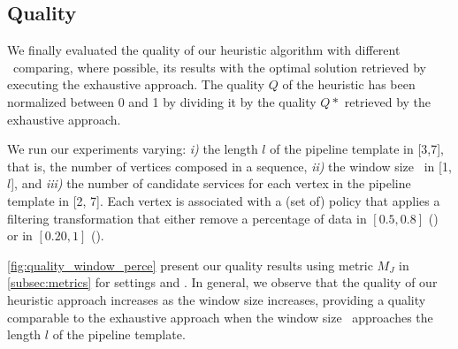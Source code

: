 
  \subsection{Quality}\label{subsec:experiments_quality}
  We finally evaluated the quality of our heuristic algorithm with different \windowsize\ comparing, where possible, its results with the optimal solution retrieved by executing the exhaustive approach. %
  The quality $Q$ of the heuristic has been normalized between 0 and 1 by dividing it by the quality $Q*$ retrieved by the exhaustive approach.


  We run our experiments varying: \emph{i)} the length $l$ of the pipeline template in [3,7], that is, the number of vertices composed in a sequence, \emph{ii)} the window size \windowsize\ in [1,$l$], and \emph{iii)} the number of candidate services for each vertex in the pipeline template in [2, 7]. Each vertex is associated with a (set of) policy that applies a filtering transformation that either remove a percentage of data in $[0.5,0.8]$ (\average) or in $[0.20,1]$ (\wide).

  \cref{fig:quality_window_perce} present our quality results using metric $M_J$ in \cref{subsec:metrics} for settings \wide and \average.
  In general, we observe that the quality of our heuristic approach increases as the window size increases, providing a quality comparable to the exhaustive approach when the window size \windowsize\ approaches the length $l$ of the pipeline template.

